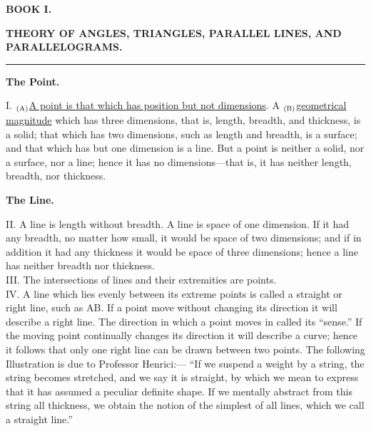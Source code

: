 \documentclass[12pt,a4paper,dvipdfmx]{jarticle}
\begin{document}
\begin{spacing}{1.5}
  \vspace{7mm}
  \begin{center}
    \LARGE
    \textbf{BOOK I.}
  \end{center}
  \begin{center}
    \textbf{THEORY OF ANGLES, TRIANGLES, PARALLEL LINES, AND PARALLELOGRAMS.}
  \end{center}
\begin{center}
  \rule{\textwidth}{0.4pt}
\end{center}

\begin{center}
  \textbf{The Point.}
\end{center}
\vspace{2mm}
I. $_{\rm(A)}$\ul{A point is that which has position but not dimensions}.
A $_{\rm(B)}$\ul{geometrical magnitude} which has three dimensions, that is, length, breadth, and thickness, is a solid; that which has two dimensions, such as length and breadth, is a surface; and
that which has but one dimension is a line. But a point is neither a solid, nor a surface, nor
a line; hence it has no dimensions—that is, it has neither length, breadth, nor thickness. \\

\begin{center}
  \textbf{The Line.}
\end{center}
\vspace{2mm}
II. A line is length without breadth.
A line is space of one dimension. If it had any breadth, no matter how small, it would
be space of two dimensions; and if in addition it had any thickness it would be space of three
dimensions; hence a line has neither breadth nor thickness. \\

III. The intersections of lines and their extremities are points. \\

IV. A line which lies evenly between its extreme points is called a straight or right line, such as AB.
If a point move without changing its direction it will describe a right line. The direction in
which a point moves in called its “sense.” If the moving point continually changes its direction
it will describe a curve; hence it follows that only one right line can be drawn between two
points. The following Illustration is due to Professor Henrici:— “If we suspend a weight by a
string, the string becomes stretched, and we say it is straight, by which we mean to express
that it has assumed a peculiar definite shape. If we mentally abstract from this string all
thickness, we obtain the notion of the simplest of all lines, which we call a straight line.”


\end{spacing}
\end{document}
